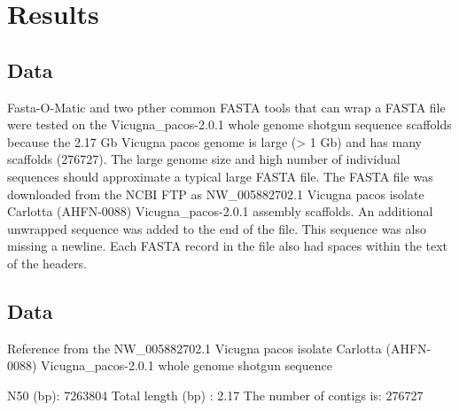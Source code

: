 \section{Results}

\subsection{Data}

Fasta-O-Matic and two pther common FASTA tools that can wrap a FASTA file were tested on the Vicugna_pacos-2.0.1 whole genome shotgun sequence scaffolds because the 2.17 Gb Vicugna pacos genome is large (> 1 Gb) and has many scaffolds (276727). The large genome size and high number of individual sequences should approximate a typical large FASTA file. The FASTA file was downloaded from the NCBI FTP as NW_005882702.1 Vicugna pacos isolate Carlotta (AHFN-0088) Vicugna_pacos-2.0.1 assembly scaffolds.
An additional unwrapped sequence was added to the end of the file. This sequence was also missing a newline. Each FASTA record in the file also had spaces within the text of the headers.

\subsection{Data}

Reference from the NW_005882702.1 Vicugna pacos isolate Carlotta (AHFN-0088) Vicugna_pacos-2.0.1 whole genome shotgun sequence

N50 (bp): 7263804
Total length (bp) : 2.17
The number of contigs is: 276727